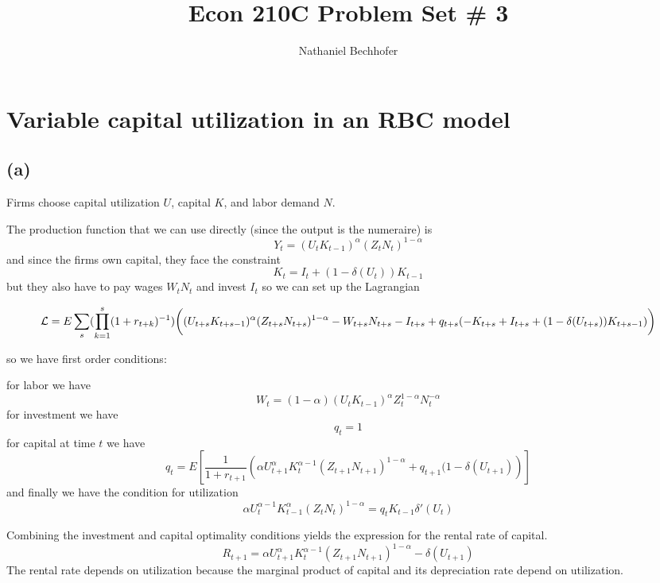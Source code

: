 \documentclass[11pt]{amsart}
\title{Econ 210C Problem Set \# 3}
\author{Nathaniel Bechhofer}
\begin{document}
\maketitle


\section{}


\section{Variable capital utilization in an RBC model}

\subsection*{(a)}

Firms choose capital utilization $U$, capital $K$, and labor demand $N$.

The production function that we can use directly (since the output is the numeraire) is
\[
Y_t = (U_t K_{t-1})^{\alpha} (Z_t N_t)^{1-\alpha}
\]
and since the firms own capital, they face the constraint
\[
K_t = I_t + (1 - \delta(U_t)) K_{t-1}
\]
but they also have to pay wages $W_t N_t$ and invest $I_t$
so we can set up the Lagrangian
\begin{tiny}
\[
\mathcal{L} = E \sum_s (\prod_{k=1}^s (1+r_{t+k})^{-1}) \bigg{(} (U_{t+s} K_{t+s-1})^{\alpha} (Z_{t+s} N_{t+s})^{1-\alpha} - W_{t+s} N_{t+s} - I_{t+s} + q_{t+s} (-K_{t+s} +  I_{t+s} + (1 - \delta(U_{t+s})) K_{t+s-1}) \bigg{)}
\]
\end{tiny}
so we have first order conditions:

for labor we have
\[
W_t = (1-\alpha) (U_{t} K_{t-1})^{\alpha} Z_{t}^{1-\alpha} N_t^{-\alpha}
\]
for investment we have
\[
q_t = 1
\]
for capital at time $t$ we have
\[
q_t = E \left[ \frac{1}{1+r_{t+1}} \left( \alpha U_{t+1}^{\alpha} K_t^{\alpha -1} (Z_{t+1} N_{t+1})^{1-\alpha} + q_{t+1} (1 - \delta(U_{t+1})  \right) \right]
\]
and finally we have the condition for utilization
\[
\alpha U_t^{\alpha - 1} K_{t-1}^{\alpha} (Z_{t} N_{t})^{1-\alpha} = q_t K_{t-1} \delta'(U_t)
\]

Combining the investment and capital optimality conditions yields the expression for the rental rate of capital. 
\[
	R_{t+1} = \alpha U_{t+1}^{\alpha} K_t^{\alpha -1} \left(Z_{t+1} N_{t+1}  \right)^{1-\alpha} - \delta(U_{t+1})
\]
The rental rate depends on utilization because the marginal product of capital and its depreciation rate depend on utilization. 
\end{document}
